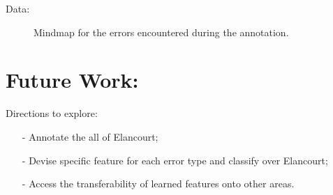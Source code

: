 \documentclass[9pt]{beamer}
\begin{document}
	\begin{frame}{Data:}
		\begin{figure}
			\begin{center}
				\caption{\label{img::mind_map} Mindmap for the errors encountered during the annotation.}
			\end{center}
		\end{figure}
	\end{frame}

	\section[Future]{Future Work:}

	\begin{frame}{Directions to explore:}
		
		\begin{itemize}
			\item[-] Annotate the all of Elancourt;
			\item[-] Devise specific feature for each error type and classify over Elancourt;
			\item[-] Access the transferability of learned features onto other areas.
		\end{itemize}
	\end{frame}
	
\end{document}
